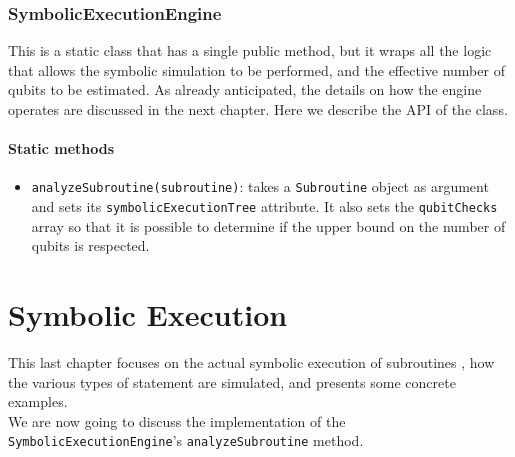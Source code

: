 \documentclass[12pt,a4paper]{report}
\theoremstyle{definition}
\theoremstyle{definition}
\theoremstyle{definition}
\begin{document}
\subsection{SymbolicExecutionEngine}
This is a static class that has a single public method, but it wraps all the logic that allows the symbolic simulation to be performed, and the effective number of qubits to be estimated. As already anticipated, the details on how the engine operates are discussed in the next chapter. Here we describe the API of the class.
\subsubsection{Static methods}
\begin{itemize}
    \itemsep 0em
    \item \texttt{analyzeSubroutine(subroutine)}: takes a \texttt{Subroutine} object as argument and sets its \texttt{symbolicExecutionTree} attribute. It also sets the \texttt{qubitChecks} array so that it is possible to determine if the upper bound on the number of qubits is respected.
\end{itemize}


\chapter{Symbolic Execution}
This last chapter focuses on the actual symbolic execution of subroutines \cite{SurveySymExec-CSUR18}, how the various types of statement are simulated, and presents some concrete examples.\\
We are now going to discuss the implementation of the \texttt{SymbolicExecutionEngine}'s \texttt{analyzeSubroutine} method.\\
\end{document}
